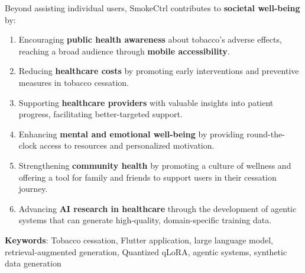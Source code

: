 \documentclass[12pt, a4paper, oneside]{Thesis} %
\begin{document}
{Beyond assisting individual users, SmokeCtrl contributes to \textbf{societal well-being} by:

\begin{enumerate}
    \item Encouraging \textbf{public health awareness} about tobacco’s adverse effects, reaching a broad audience through \textbf{mobile accessibility}.
    \item Reducing \textbf{healthcare costs} by promoting early interventions and preventive measures in tobacco cessation.
    \item Supporting \textbf{healthcare providers} with valuable insights
    into patient progress, facilitating better-targeted support.
    \item Enhancing \textbf{mental and emotional well-being} by providing round-the-clock access to resources and personalized motivation.
    \item Strengthening \textbf{community health} by promoting a culture of wellness and offering a tool for family and friends to support users in their cessation journey.
    \item Advancing \textbf{AI research in healthcare} through the development of agentic systems that can generate high-quality, domain-specific training data.
\end{enumerate}

\textbf{Keywords}: Tobacco cessation, Flutter application, large language model, retrieval-augmented generation, Quantized qLoRA, agentic systems, synthetic data generation

}

\clearpage %





\acknowledgements{\addtocontents{toc}{}%

I express my sincere gratitude to my supervisor, Professor Jayanta Mukhopadhyay, for granting me the opportunity to work under his mentorship. Throughout my M.Tech project, he provided insightful guidance and constructive feedback. He was consistently supportive and understanding.

I am grateful for the chance to have worked on this project and to have learned from the people I have met along the way. This project has been challenging but rewarding, and I am proud of what I have achieved. I would also like to extend my warmest gratitude to my family and friends at IIT Kharagpur for their unwavering support and motivation throughout my journey.
}
\clearpage %
\end{document}
